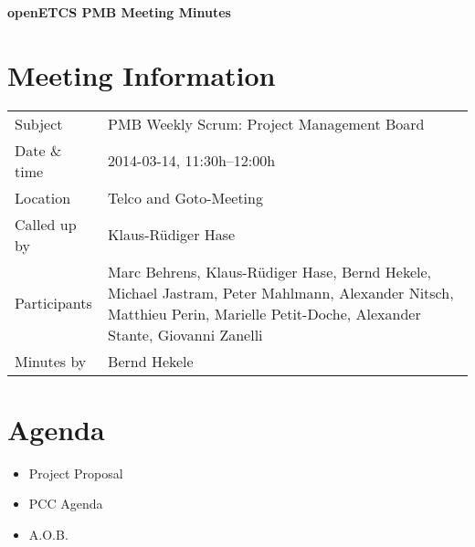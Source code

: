 \documentclass[a4paper, 11pt]{article}
\begin{document}
{\begin{center}\huge\bf openETCS PMB Meeting Minutes\end{center}}
\section{Meeting Information}

\renewcommand{\arraystretch}{1.5}
\begin{supertabular}{m{.2\textwidth}m{.8\textwidth}}
Subject & PMB Weekly Scrum: Project Management Board\\
Date \& time & 2014-03-14, 11:30h--12:00h\\
Location & Telco and Goto-Meeting\\
Called up by & Klaus-R\"udiger Hase\\
Participants &
Marc Behrens,
Klaus-R\"udiger Hase,
Bernd Hekele,
Michael Jastram,
Peter Mahlmann,
Alexander Nitsch,
Matthieu Perin,
Marielle Petit-Doche,
Alexander Stante,
Giovanni Zanelli
\\

Minutes by & Bernd Hekele\\

\end{supertabular}
\renewcommand{\arraystretch}{1.0}


\section{{Agenda}}

\begin{itemize}
\item Project Proposal
\item PCC Agenda
\item A.O.B.
\end{itemize}
\end{document}
